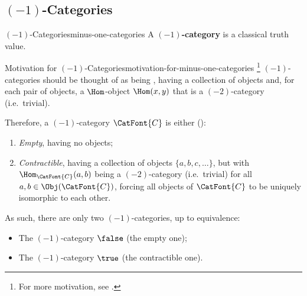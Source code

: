 \subsection{\texorpdfstring{$(-1)$}{(-1)}-Categories}\label{subsection-minus-one-categories}
\begin{definition}{$(-1)$-Categories}{minus-one-categories}%
    A \textbf{$(-1)$-category} is a classical truth value.%
\end{definition}
\begin{remark}{Motivation for $(-1)$-Categories}{motivation-for-minus-one-categories}%
    \footnote{%
        For more motivation, see \cite[p.~13]{lectures-on-n-categories-and-cohomology}.
        \par\vspace*{-1.75\baselineskip}
    }%
    $(-1)$-categories should be thought of as being , having a collection of objects and, for each pair of objects, a $\Hom$-object $\Hom(x,y)$ that is a $(-2)$-category (i.e.\ trivial).

    Therefore, a $(-1)$-category $\CatFont{C}$ is either (\cite[pp.~33--34]{lectures-on-n-categories-and-cohomology}):%
    \begin{enumerate}
        \item \emph{Empty}, having no objects;
        \item \emph{Contractible}, having a collection of objects $\{a,b,c,\ldots\}$, but with $\Hom_{\CatFont{C}}(a,b)$ being a $(-2)$-category (i.e.\ trivial) for all $a,b\in\Obj(\CatFont{C})$, forcing all objects of $\CatFont{C}$ to be uniquely isomorphic to each other.
    \end{enumerate}
    As such, there are only two $(-1)$-categories, up to equivalence:
    \begin{itemize}
        \item The $(-1)$-category $\false$ (the empty one);
        \item The $(-1)$-category $\true$  (the contractible one).%
    \end{itemize}
\end{remark}
